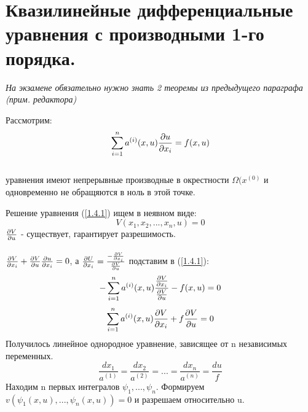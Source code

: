 \documentclass[../main.tex]{subfiles}
\begin{document}
\section{Квазилинейные дифференциальные уравнения с производными 1-го порядка.}


\textit{На экзамене обязательно нужно знать 2 теоремы из предыдущего параграфа (прим. редактора)}


\par Рассмотрим:
\begin{equation}\label{1.4.1}
	\sum_{i=1}^{n}a^{(i)}(x,u)\frac{\partial u}{\partial x_i}=f(x,u)
\end{equation}
\\ уравнения имеют непрерывные производные в окрестности $\Omega(x^{(0)}$ и одновременно не обращяются в ноль в этой точке.\\

\par Решение уравнения (\ref{1.4.1}) ищем в неявном виде:
$$V(x_1,x_2,...,x_n,u)=0$$
$\frac{\partial V}{\partial u}$ - существует, гарантирует разрешимость.
\\ \\
$\frac{\partial V}{\partial x_i}+\frac{\partial V}{\partial u}\frac{\partial u}{\partial x_i} = 0$, а $\frac{\partial U}{\partial x_i} = \frac{-\frac{\partial V}{\partial x_i}}{\frac{\partial V}{\partial u}}$ подставим в (\ref{1.4.1}):\\

$$-\sum_{i=1}^{n}a^{(i)}(x,u)\frac{\frac{\partial V}{\partial x_i}}{\frac{\partial V}{\partial u}}-f(x,u)=0$$
$$\sum_{i=1}^{n}a^{(i)}(x,u)\frac{\partial V}{\partial x_i}+f\frac{\partial V}{\partial u} = 0$$
Получилось линейное однородное уравнение, зависящее от n независимых переменных.
$$\frac{dx_1}{a^{(1)}}=\frac{dx_2}{a^{(2)}}=...=\frac{dx_n}{a^{(n)}}=\frac{du}{f}$$
Находим n первых интегралов $\psi_1,...,\psi_n$. Формируем $v(\psi_1(x,u),...,\psi_n(x,u))=0$ и разрешаем относительно u.
\end{document}
